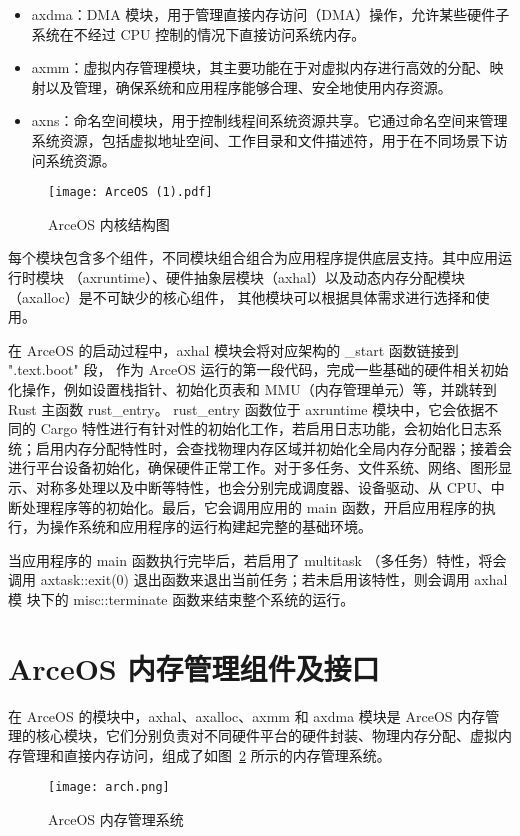 \begin{itemize}
\item axdma：DMA 模块，用于管理直接内存访问（DMA）操作，允许某些硬件子系统在不经过 CPU 控制的情况下直接访问系统内存。
\item axmm：虚拟内存管理模块，其主要功能在于对虚拟内存进行高效的分配、映射以及管理，确保系统和应用程序能够合理、安全地使用内存资源。
\item axns：命名空间模块，用于控制线程间系统资源共享。它通过命名空间来管理系统资源，包括虚拟地址空间、工作目录和文件描述符，用于在不同场景下访问系统资源。
\end{itemize}

\begin{figure}
  \centering
  \texttt{[image: ArceOS (1).pdf]}
  \caption{ArceOS 内核结构图}
  \label{fig:ArceOS}
\end{figure}

每个模块包含多个组件，不同模块组合组合为应用程序提供底层支持。其中应用运行时模块
（axruntime）、硬件抽象层模块（axhal）以及动态内存分配模块（axalloc）是不可缺少的核心组件，
其他模块可以根据具体需求进行选择和使用。

在 ArceOS 的启动过程中，axhal 模块会将对应架构的 \_start 函数链接到 ".text.boot" 段， 作为 ArceOS 运行的第一段代码，完成一些基础的硬件相关初始化操作，例如设置栈指针、初始化页表和 MMU（内存管理单元）等，并跳转到 Rust 主函数 rust\_entry。
rust\_entry 函数位于 axruntime 模块中，它会依据不同的 Cargo 特性进行有针对性的初始化工作，若启用日志功能，会初始化日志系统；启用内存分配特性时，会查找物理内存区域并初始化全局内存分配器；接着会进行平台设备初始化，确保硬件正常工作。对于多任务、文件系统、网络、图形显示、对称多处理以及中断等特性，也会分别完成调度器、设备驱动、从 CPU、中断处理程序等的初始化。最后，它会调用应用的 main 函数，开启应用程序的执行，为操作系统和应用程序的运行构建起完整的基础环境。

当应用程序的 main 函数执行完毕后，若启用了 multitask （多任务）特性，将会调用 axtask::exit(0) 退出函数来退出当前任务；若未启用该特性，则会调用 axhal 模
块下的 misc::terminate 函数来结束整个系统的运行。

\section{ArceOS 内存管理组件及接口}
在 ArceOS 的模块中，axhal、axalloc、axmm 和 axdma 模块是 ArceOS 内存管理的核心模块，它们分别负责对不同硬件平台的硬件封装、物理内存分配、虚拟内存管理和直接内存访问，组成了如图~\ref{fig:ArceOS-mm} 所示的内存管理系统。

\begin{figure}
  \centering
  \texttt{[image: arch.png]}
  \caption{ArceOS 内存管理系统}
  \label{fig:ArceOS-mm}
\end{figure}

